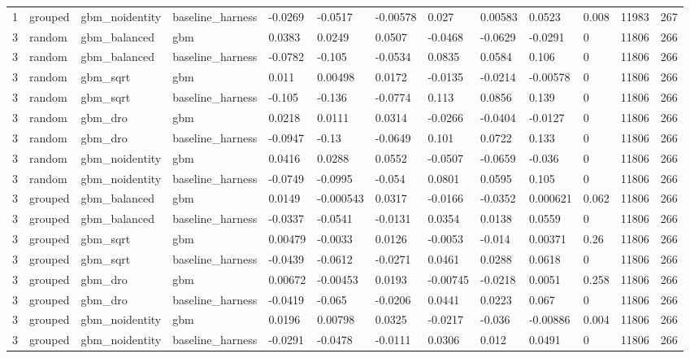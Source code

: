 \begin{tabular}{lllllllllllll}
1 & grouped & gbm\_noidentity & baseline\_harness & -0.0269 & -0.0517 & -0.00578 & 0.027 & 0.00583 & 0.0523 & 0.008 & 11983 & 267 \\
3 & random & gbm\_balanced & gbm & 0.0383 & 0.0249 & 0.0507 & -0.0468 & -0.0629 & -0.0291 & 0 & 11806 & 266 \\
3 & random & gbm\_balanced & baseline\_harness & -0.0782 & -0.105 & -0.0534 & 0.0835 & 0.0584 & 0.106 & 0 & 11806 & 266 \\
3 & random & gbm\_sqrt & gbm & 0.011 & 0.00498 & 0.0172 & -0.0135 & -0.0214 & -0.00578 & 0 & 11806 & 266 \\
3 & random & gbm\_sqrt & baseline\_harness & -0.105 & -0.136 & -0.0774 & 0.113 & 0.0856 & 0.139 & 0 & 11806 & 266 \\
3 & random & gbm\_dro & gbm & 0.0218 & 0.0111 & 0.0314 & -0.0266 & -0.0404 & -0.0127 & 0 & 11806 & 266 \\
3 & random & gbm\_dro & baseline\_harness & -0.0947 & -0.13 & -0.0649 & 0.101 & 0.0722 & 0.133 & 0 & 11806 & 266 \\
3 & random & gbm\_noidentity & gbm & 0.0416 & 0.0288 & 0.0552 & -0.0507 & -0.0659 & -0.036 & 0 & 11806 & 266 \\
3 & random & gbm\_noidentity & baseline\_harness & -0.0749 & -0.0995 & -0.054 & 0.0801 & 0.0595 & 0.105 & 0 & 11806 & 266 \\
3 & grouped & gbm\_balanced & gbm & 0.0149 & -0.000543 & 0.0317 & -0.0166 & -0.0352 & 0.000621 & 0.062 & 11806 & 266 \\
3 & grouped & gbm\_balanced & baseline\_harness & -0.0337 & -0.0541 & -0.0131 & 0.0354 & 0.0138 & 0.0559 & 0 & 11806 & 266 \\
3 & grouped & gbm\_sqrt & gbm & 0.00479 & -0.0033 & 0.0126 & -0.0053 & -0.014 & 0.00371 & 0.26 & 11806 & 266 \\
3 & grouped & gbm\_sqrt & baseline\_harness & -0.0439 & -0.0612 & -0.0271 & 0.0461 & 0.0288 & 0.0618 & 0 & 11806 & 266 \\
3 & grouped & gbm\_dro & gbm & 0.00672 & -0.00453 & 0.0193 & -0.00745 & -0.0218 & 0.0051 & 0.258 & 11806 & 266 \\
3 & grouped & gbm\_dro & baseline\_harness & -0.0419 & -0.065 & -0.0206 & 0.0441 & 0.0223 & 0.067 & 0 & 11806 & 266 \\
3 & grouped & gbm\_noidentity & gbm & 0.0196 & 0.00798 & 0.0325 & -0.0217 & -0.036 & -0.00886 & 0.004 & 11806 & 266 \\
3 & grouped & gbm\_noidentity & baseline\_harness & -0.0291 & -0.0478 & -0.0111 & 0.0306 & 0.012 & 0.0491 & 0 & 11806 & 266 \\

\end{tabular}
